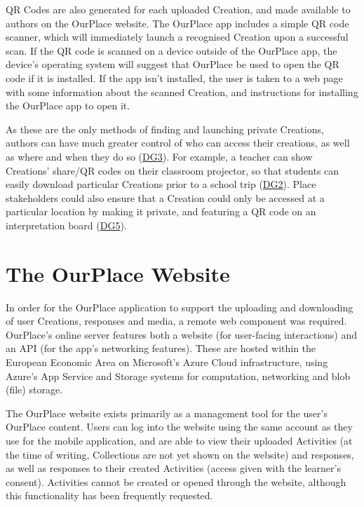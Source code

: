 QR Codes are also generated for each uploaded Creation, and made available to authors on the OurPlace website. The OurPlace app includes a simple QR code scanner, which will immediately launch a recognised Creation upon a successful scan. If the QR code is scanned on a device outside of the OurPlace app, the device's operating system will suggest that OurPlace be used to open the QR code if it is installed. If the app isn't installed, the user is taken to a web page with some information about the scanned Creation, and instructions for installing the OurPlace app to open it.

As these are the only methods of finding and launching private Creations, authors can have much greater control of who can access their creations, as well as where and when they do so (\hyperref[DG3]{DG3}). For example, a teacher can show Creations' share/QR codes on their classroom projector, so that students can easily download particular Creations prior to a school trip (\hyperref[DG2]{DG2}). Place stakeholders could also ensure that a Creation could only be accessed at a particular location by making it private, and featuring a QR code on an interpretation board (\hyperref[DG5]{DG5}). 

\section{The OurPlace Website}
\label{sec:ImplementationWeb}
In order for the OurPlace application to support the uploading and downloading of user Creations, responses and media, a remote web component was required. OurPlace's online server features both a website (for user-facing interactions) and an API (for the app's networking features). These are hosted within the European Economic Area on Microsoft's Azure Cloud infrastructure, using Azure's App Service and Storage systems for computation, networking and blob (file) storage.

The OurPlace website exists primarily as a management tool for the user's OurPlace content. Users can log into the website using the same account as they use for the mobile application, and are able to view their uploaded Activities (at the time of writing, Collections are not yet shown on the website) and responses, as well as responses to their created Activities (access given with the learner's consent). Activities cannot be created or opened through the website, although this functionality has been frequently requested. 


